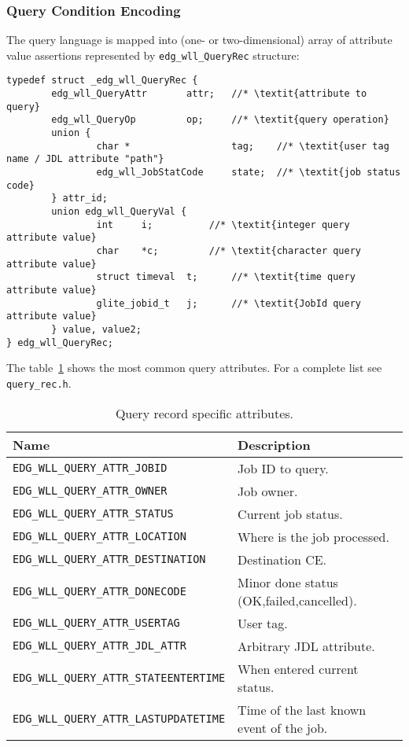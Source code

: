 \subsubsection{Query Condition Encoding}
\label{s:queryrec}
The \LB query language is mapped into (one- or two-dimensional) array
of attribute value assertions represented by
\verb'edg_wll_QueryRec' structure:
\begin{lstlisting}
typedef struct _edg_wll_QueryRec {
        edg_wll_QueryAttr       attr;   //* \textit{attribute to query}
        edg_wll_QueryOp         op;     //* \textit{query operation}
        union {
                char *                  tag;    //* \textit{user tag name / JDL attribute "path"}
                edg_wll_JobStatCode     state;  //* \textit{job status code}
        } attr_id;
        union edg_wll_QueryVal {
                int     i;      	//* \textit{integer query attribute value}
                char    *c;     	//* \textit{character query attribute value}
                struct timeval  t;      //* \textit{time query attribute value}
                glite_jobid_t   j;      //* \textit{JobId query attribute value}
        } value, value2;
} edg_wll_QueryRec;
\end{lstlisting}


The table~\ref{t:cqueryattr} shows the most common query attributes.
For a complete list see \texttt{query\_rec.h}.

\begin{table}[ht]
\begin{tabularx}{\textwidth}{lX}
{\bf Name} & {\bf Description} \\
\hline
\lstinline'EDG_WLL_QUERY_ATTR_JOBID' & Job ID to query. \\
\lstinline'EDG_WLL_QUERY_ATTR_OWNER' & Job owner. \\
\lstinline'EDG_WLL_QUERY_ATTR_STATUS' & Current job status. \\
\lstinline'EDG_WLL_QUERY_ATTR_LOCATION' & Where is the job processed. \\
\lstinline'EDG_WLL_QUERY_ATTR_DESTINATION' & Destination CE. \\
\lstinline'EDG_WLL_QUERY_ATTR_DONECODE' & Minor done status (OK,failed,cancelled). \\
\lstinline'EDG_WLL_QUERY_ATTR_USERTAG' & User tag. \\
\lstinline'EDG_WLL_QUERY_ATTR_JDL_ATTR' & Arbitrary JDL attribute. \\
\lstinline'EDG_WLL_QUERY_ATTR_STATEENTERTIME' & When entered current status. \\
\lstinline'EDG_WLL_QUERY_ATTR_LASTUPDATETIME' & Time of the last known event of the job. \\
\end{tabularx}
\caption{Query record specific attributes.}
\label{t:cqueryattr}
\end{table}


